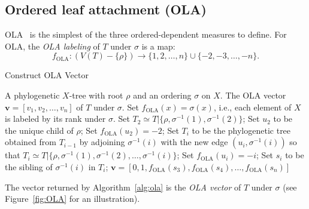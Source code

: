 \documentclass{article}
\newcommand{\OLA}{\mathrm{OLA}}
\begin{document}
\subsection{Ordered leaf attachment (OLA)}
\label{sec:OLA}

OLA~\cite{ola} is the simplest of the three ordered-dependent measures to define. For OLA, the {\em OLA labeling} of $T$ under $\sigma$ is a map:
$$f_\OLA: (V(T) -\{\rho\})\rightarrow \{1, 2, \ldots, n\} \cup \{-2,-3,\ldots,-n\}.$$

\begin{algorithm}[H]
\caption{{\sc Construct OLA Vector}}
\begin{algorithmic}[1]
 A phylogenetic $X$-tree with root $\rho$ and an ordering $\sigma$ on $X$.
 The OLA vector $\mathbf{v}=[v_1, v_2, \ldots, v_n]$ of $T$ under $\sigma$.
\STATE Set $f_\OLA(x) = \sigma(x)$, i.e., each element of $X$ is labeled by its rank under $\sigma$.
\ENDFOR
\STATE Set $T_2\simeq T|\{\rho, \sigma^{-1}(1),\sigma^{-1}(2)\}$;
\STATE Set $u_2$ to be the unique child of $\rho$;
\STATE Set $f_\OLA(u_2)=-2$;
\STATE Set $T_i$ to be the phylogenetic tree obtained from $T_{i-1}$ by adjoining $\sigma^{-1}(i)$ with the new edge $(u_i, \sigma^{-1}(i))$ so that $T_i\simeq T|\{\rho, \sigma^{-1}(1), \sigma^{-1}(2), \ldots, \sigma^{-1}(i)\}$;
\STATE Set $f_\OLA(u_i)=-i$;
\STATE Set $s_i$ to be the sibling of $\sigma^{-1}(i)$ in $T_i$;
\ENDFOR
\RETURN $\mathbf{v}=[0, 1, f_\OLA(s_3), f_\OLA(s_4), \ldots, f_\OLA(s_n)]$
\end{algorithmic}
\label{alg:ola}
\end{algorithm}


\noindent The vector returned by Algorithm~\ref{alg:ola} is the {\em OLA vector} of $T$ under $\sigma$ (see Figure~\ref{fig:OLA} for an illustration).
\end{document}
